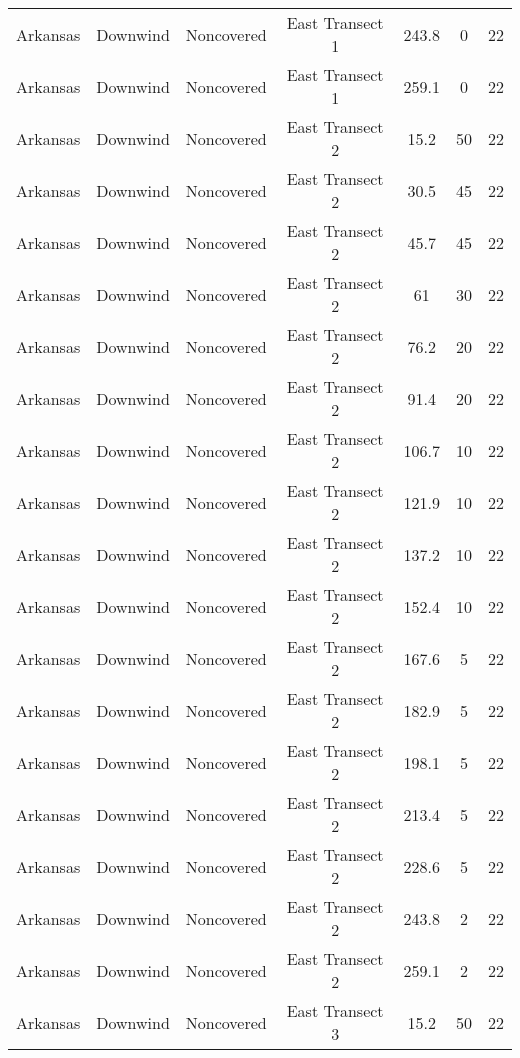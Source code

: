 \documentclass{article}
\begin{document}
\begin{longtable}[c]{ccccccc}
Arkansas  & Downwind  & Noncovered & East Transect 1 & 243.8        & 0           & 22  \\
Arkansas  & Downwind  & Noncovered & East Transect 1 & 259.1        & 0           & 22  \\
Arkansas  & Downwind  & Noncovered & East Transect 2 & 15.2         & 50          & 22  \\
Arkansas  & Downwind  & Noncovered & East Transect 2 & 30.5         & 45          & 22  \\
Arkansas  & Downwind  & Noncovered & East Transect 2 & 45.7         & 45          & 22  \\
Arkansas  & Downwind  & Noncovered & East Transect 2 & 61           & 30          & 22  \\
Arkansas  & Downwind  & Noncovered & East Transect 2 & 76.2         & 20          & 22  \\
Arkansas  & Downwind  & Noncovered & East Transect 2 & 91.4         & 20          & 22  \\
Arkansas  & Downwind  & Noncovered & East Transect 2 & 106.7        & 10          & 22  \\
Arkansas  & Downwind  & Noncovered & East Transect 2 & 121.9        & 10          & 22  \\
Arkansas  & Downwind  & Noncovered & East Transect 2 & 137.2        & 10          & 22  \\
Arkansas  & Downwind  & Noncovered & East Transect 2 & 152.4        & 10          & 22  \\
Arkansas  & Downwind  & Noncovered & East Transect 2 & 167.6        & 5           & 22  \\
Arkansas  & Downwind  & Noncovered & East Transect 2 & 182.9        & 5           & 22  \\
Arkansas  & Downwind  & Noncovered & East Transect 2 & 198.1        & 5           & 22  \\
Arkansas  & Downwind  & Noncovered & East Transect 2 & 213.4        & 5           & 22  \\
Arkansas  & Downwind  & Noncovered & East Transect 2 & 228.6        & 5           & 22  \\
Arkansas  & Downwind  & Noncovered & East Transect 2 & 243.8        & 2           & 22  \\
Arkansas  & Downwind  & Noncovered & East Transect 2 & 259.1        & 2           & 22  \\
Arkansas  & Downwind  & Noncovered & East Transect 3 & 15.2         & 50          & 22  \\

\end{longtable}
\end{document}
